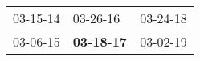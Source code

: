\begin{supertabular}{p{0.33\columnwidth}p{0.33\columnwidth}p{0.33\columnwidth}}
 03-15-14\textsuperscript{} &           03-26-16\textsuperscript{} &  03-24-18\textsuperscript{} \\
 03-06-15\textsuperscript{} &  \textbf{03-18-17\textsuperscript{}} &  03-02-19\textsuperscript{} \\
\end{supertabular}
